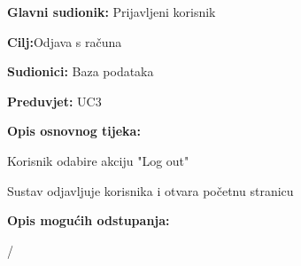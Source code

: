    				
   				\begin{packed_item}
   					
   					\item \textbf{Glavni sudionik: }Prijavljeni korisnik
   					\item  \textbf{Cilj:}Odjava s računa 
   					\item  \textbf{Sudionici:} Baza podataka
   					\item  \textbf{Preduvjet:} UC3
   					\item  \textbf{Opis osnovnog tijeka:}
   					
   					\item[] \begin{packed_enum}
   						
   						\item Korisnik odabire akciju "Log out" 
   						\item Sustav odjavljuje korisnika i otvara početnu stranicu
   						
   						
   					\end{packed_enum}
   					
   					\item  \textbf{Opis mogućih odstupanja:}
   					
   					\begin{packed_enum}
   						
   						\item /
   						
   					\end{packed_enum}
   					
   				\end{packed_item}
   			
   			    \noindent {}
   			    
